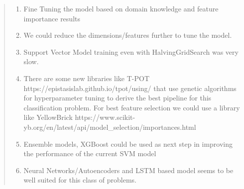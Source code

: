 \documentclass[11pt]{article}
\providecommand{\tightlist}{%
      \setlength{\itemsep}{0pt}\setlength{\parskip}{0pt}}
\begin{document}
\begin{quote}
\begin{enumerate}
\def\labelenumi{\arabic{enumi}.}
\tightlist
\item
  Fine Tuning the model based on domain knowledge and feature importance
  results
\item
  We could reduce the dimensions/features further to tune the model.
\item
  Support Vector Model training even with HalvingGridSearch was very
  slow.
\item
  There are some new libraries like T-POT
  https://epistasislab.github.io/tpot/using/ that use genetic algorithms
  for hyperparameter tuning to derive the best pipeline for this
  classification problem. For best feature selection we could use a
  library like YellowBrick
  https://www.scikit-yb.org/en/latest/api/model\_selection/importances.html
\item
  Ensemble models, XGBoost could be used as next step in improving the
  performance of the current SVM model
\item
  Neural Networks/Autoencoders and LSTM based model seems to be well
  suited for this class of problems.
\end{enumerate}
\end{quote}


    
    
    
    
\end{document}
